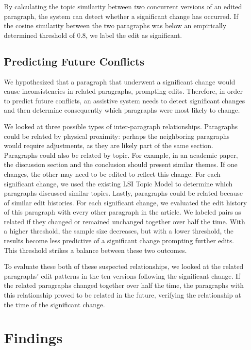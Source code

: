 By calculating the topic similarity between two concurrent versions of
an edited paragraph, the system can detect whether a significant change
has occurred. If the cosine similarity between the two paragraphs was
below an empirically determined threshold of 0.8, we label the edit as
significant.

\subsection{Predicting Future
Conflicts}\label{predicting-future-conflicts}

We hypothesized that a paragraph that underwent a significant change
would cause inconsistencies in related paragraphs, prompting edits.
Therefore, in order to predict future conflicts, an assistive system
needs to detect significant changes and then determine consequently
which paragraphs were most likely to change.

We looked at three possible types of inter-paragraph relationships.
Paragraphs could be related by physical proximity: perhaps the
neighboring paragraphs would require adjustments, as they are likely
part of the same section. Paragraphs could also be related by topic. For
example, in an academic paper, the discussion section and the conclusion
should present similar themes. If one changes, the other may need to be
edited to reflect this change. For each significant change, we used the
existing LSI Topic Model to determine which paragraphs discussed similar
topics. Lastly, paragraphs could be related because of similar edit
histories. For each significant change, we evaluated the edit history of
this paragraph with every other paragraph in the article. We labeled
pairs as related if they changed or remained unchanged together over
half the time. With a higher threshold, the sample size decreases, but
with a lower threshold, the results become less predictive of a
significant change prompting further edits. This threshold strikes a
balance between these two outcomes.

To evaluate these both of these suspected relationships, we looked at
the related paragraphs' edit patterns in the ten versions following the
significant change. If the related paragraphs changed together over half
the time, the paragraphs with this relationship proved to be related in
the future, verifying the relationship at the time of the significant
change.

\section{Findings}\label{findings}

